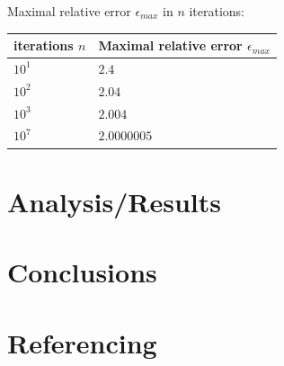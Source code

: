 \documentclass[%
oneside,                 %
final,                   %
10pt]{article}
\begin{document}
Maximal relative error $\epsilon_{max}$  in $n$ iterations:

\begin{center}
    \begin{tabular}{| l | l |}
    \hline
    \textbf{iterations $n$} & \textbf{Maximal relative error $\epsilon_{max}$} \\
    \hline
    $10^1$ & $2.4$ \\
    \hline
    $10^2$ & $2.04$ \\
    \hline
    $10^3$ & $2.004$ \\
    \hline
    $10^7$ & $2.0000005$ \\
    \hline
   
    
    \end{tabular}
\end{center}


\newpage

\section{Analysis/Results}

\newpage

\section{Conclusions} 

\newpage


\section{Referencing}

\newpage
\end{document}
